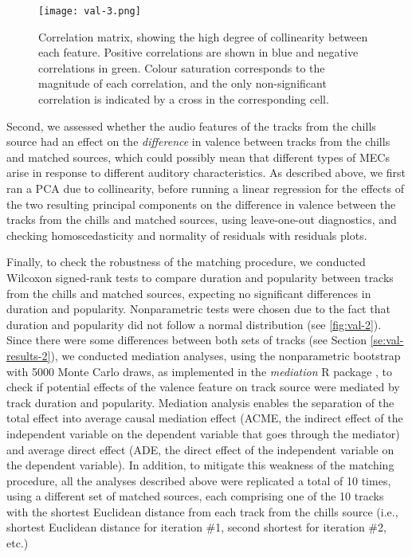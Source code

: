 \begin{figure}[t!]
\texttt{[image: val-3.png]}
\centering
\caption{Correlation matrix, showing the high degree of collinearity between each feature. Positive correlations are shown in blue and negative correlations in green. Colour saturation corresponds to the magnitude of each correlation, and the only non-significant correlation is indicated by a cross in the corresponding cell.}
\label{fig:val-3}
\end{figure}

Second, we assessed whether the audio features of the tracks from the chills source had an effect on the \emph{difference} in valence between tracks from the chills and matched sources, which could possibly mean that different types of MECs arise in response to different auditory characteristics. As described above, we first ran a PCA due to collinearity, before running a linear regression for the effects of the two resulting principal components on the difference in valence between the tracks from the chills and matched sources, using leave-one-out diagnostics, and checking homoscedasticity and normality of residuals with residuals plots.

Finally, to check the robustness of the matching procedure, we conducted Wilcoxon signed-rank tests to compare duration and popularity between tracks from the chills and matched sources, expecting no significant differences in duration and popularity. Nonparametric tests were chosen due to the fact that duration and popularity did not follow a normal distribution (see \autoref{fig:val-2}). Since there were some differences between both sets of tracks (see Section \ref{se:val-results-2}), we conducted mediation analyses, using the nonparametric bootstrap with 5000 Monte Carlo draws, as implemented in the \emph{mediation} R package \parencite{tingley2014}, to check if potential effects of the valence feature on track source were mediated by track duration and popularity. Mediation analysis enables the separation of the total effect into average causal mediation effect (ACME, the indirect effect of the independent variable on the dependent variable that goes through the mediator) and average direct effect (ADE, the direct effect of the independent variable on the dependent variable). In addition, to mitigate this weakness of the matching procedure, all the analyses described above were replicated a total of 10 times, using a different set of matched sources, each comprising one of the 10 tracks with the shortest Euclidean distance from each track from the chills source (i.e., shortest Euclidean distance for iteration \#1, second shortest for iteration \#2, etc.)

